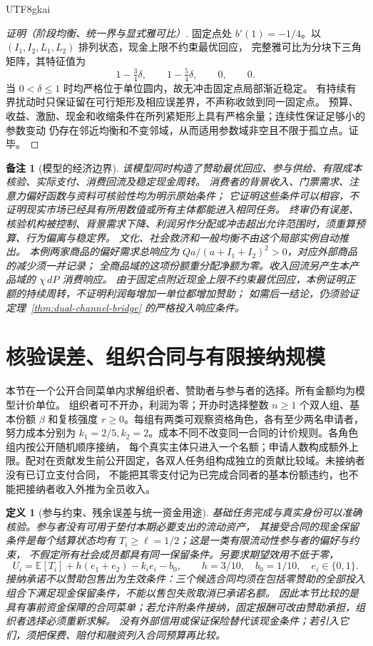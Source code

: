 \documentclass[12pt,a4paper,openany]{report}
\newtheorem{definition}{定义}[chapter]
\newtheorem{remark}{备注}[chapter]
\newcommand{\EE}{\mathbb E}
\begin{document}
\begin{CJK*}{UTF8}{gkai}
\begin{proof}[证明（阶段均衡、统一界与显式雅可比）]
固定点处 \(b'(1)=-1/4\)。以 \((I_1,I_2,L_1,L_2)\) 排列状态，现金上限不约束最优回应，
完整雅可比为分块下三角矩阵，其特征值为
\[
 1-\tfrac34\delta,\qquad 1-\tfrac54\delta,\qquad 0,\qquad0.
\]
当 \(0<\delta\le1\) 时均严格位于单位圆内，故无冲击固定点局部渐近稳定。
有持续有界扰动时只保证留在可行矩形及相应误差界，不声称收敛到同一固定点。
预算、收益、激励、现金和收缩条件在所列紧矩形上具有严格余量；连续性保证足够小的参数变动
仍存在邻近均衡和不变邻域，从而适用参数域非空且不限于孤立点。证毕。
\end{proof}

\begin{remark}[模型的经济边界]
该模型同时构造了赞助最优回应、参与供给、有限成本核验、实际支付、消费回流及稳定现金周转。
消费者的背景收入、门票需求、注意力偏好函数与资料可核验性均为明示原始条件；
它证明这些条件可以相容，不证明现实市场已经具有所用数值或所有主体都能进入相同任务。
终审仍有误差、核验机构被控制、背景需求下降、利润另作分配或冲击超出允许范围时，须重算预算、行为偏离与稳定界。
文化、社会救济和一般均衡不由这个局部实例自动推出。
本例两家商品的偏好需求总响应为 \(Qa/(a+I_1+I_2)^2>0\)，对应外部商品的减少须一并记录；
全商品域的这项份额重分配净额为零。收入回流另产生本产品域的 \(\chi\,dP\) 消费响应。
由于固定点附近现金上限不约束最优回应，本例证明正额的持续周转，不证明利润每增加一单位都增加赞助；
如需后一结论，仍须验证定理~\ref{thm:dual-channel-bridge} 的严格投入响应条件。
\end{remark}



\section{核验误差、组织合同与有限接纳规模}
\label{sec:contract-scale-extension}

本节在一个公开合同菜单内求解组织者、赞助者与参与者的选择。所有金额均为模型计价单位。
组织者可不开办，利润为零；开办时选择整数 \(n\ge1\) 个双人组、基本份额 \(\beta\)
和复核强度 \(r\ge0\)。每组有两类可观察资格角色，各有至少两名申请者，努力成本分别为
\(k_1=2/5,k_2=2\)。成本不同不改变同一合同的计价规则。各角色组内按公开随机顺序接纳，
每个真实主体只进入一个名额；申请人数构成额外上限。配对在贡献发生前公开固定，各双人任务组构成独立的贡献比较域。未接纳者没有已订立支付合同，
不能把其零支付记为已完成合同者的基本份额违约，也不能把接纳者收入外推为全员收入。

\begin{definition}[参与约束、残余误差与统一资金用途]
\label{def:noisy-contract-menu}
基础任务完成与真实身份可以准确核验。参与者没有可用于垫付本期必要支出的流动资产，
其接受合同的现金保留条件是每个结算状态均有 \(T_i\ge\ell=1/2\)；这是一类有限流动性参与者的偏好与约束，
不假定所有社会成员都具有同一保留条件。另要求期望效用不低于零，
\[
 U_i=\EE[T_i]+h(e_1+e_2)-k_i e_i-b_0,
 \qquad h=3/10,\quad b_0=1/10,\quad e_i\in\{0,1\}.
\]
接纳承诺不以赞助包售出为生效条件：三个候选合同均须在包括零赞助的全部投入组合下满足现金保留条件，不能以售包失败取消已承诺名额。
因此本节比较的是具有事前资金保障的合同菜单；若允许附条件接纳，固定报酬可改由赞助承担，组织者选择必须重新求解。
没有外部信用或保证保险替代该现金条件；若引入它们，须把保费、赔付和融资列入合同预算再比较。


\end{definition}
\end{CJK*}
\end{document}
